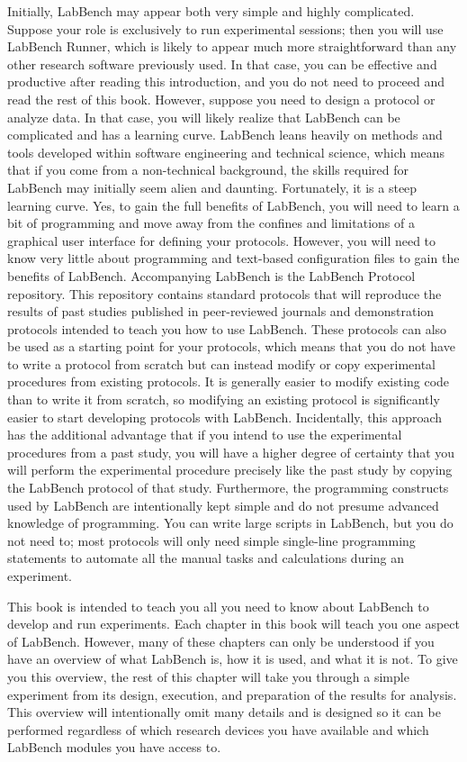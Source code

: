 Initially, LabBench may appear both very simple and highly complicated. Suppose your role is exclusively to run experimental sessions; then you will use LabBench Runner, which is likely to appear much more straightforward than any other research software previously used. In that case, you can be effective and productive after reading this introduction, and you do not need to proceed and read the rest of this book. However, suppose you need to design a protocol or analyze data. In that case, you will likely realize that LabBench can be complicated and has a learning curve. LabBench leans heavily on methods and tools developed within software engineering and technical science, which means that if you come from a non-technical background, the skills required for LabBench may initially seem alien and daunting. Fortunately, it is a steep learning curve. Yes, to gain the full benefits of LabBench, you will need to learn a bit of programming and move away from the confines and limitations of a graphical user interface for defining your protocols. However, you will need to know very little about programming and text-based configuration files to gain the benefits of LabBench. Accompanying LabBench is the LabBench Protocol repository. This repository contains standard protocols that will reproduce the results of past studies published in peer-reviewed journals and demonstration protocols intended to teach you how to use LabBench. These protocols can also be used as a starting point for your protocols, which means that you do not have to write a protocol from scratch but can instead modify or copy experimental procedures from existing protocols. It is generally easier to modify existing code than to write it from scratch, so modifying an existing protocol is significantly easier to start developing protocols with LabBench. Incidentally, this approach has the additional advantage that if you intend to use the experimental procedures from a past study, you will have a higher degree of certainty that you will perform the experimental procedure precisely like the past study by copying the LabBench protocol of that study. Furthermore, the programming constructs used by LabBench are intentionally kept simple and do not presume advanced knowledge of programming. You can write large scripts in LabBench, but you do not need to; most protocols will only need simple single-line programming statements to automate all the manual tasks and calculations during an experiment.

This book is intended to teach you all you need to know about LabBench to develop and run experiments. Each chapter in this book will teach you one aspect of LabBench. However, many of these chapters can only be understood if you have an overview of what LabBench is, how it is used, and what it is not. To give you this overview, the rest of this chapter will take you through a simple experiment from its design, execution, and preparation of the results for analysis. This overview will intentionally omit many details and is designed so it can be performed regardless of which research devices you have available and which LabBench modules you have access to.

